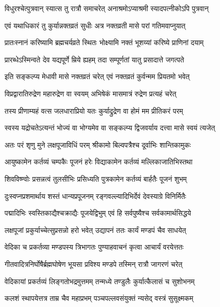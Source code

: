 \twolineshloka
{विधुरश्चेत्पुत्रवान् स्यात्स तु रात्रौ समाचरेत्}
{अनाश्रमोऽप्याश्रमी स्यादपत्नीकोऽपि पुत्रवान्} %

\twolineshloka
{एवं यथाधिकारं तु कुर्यान्नक्तव्रतं सुधीः}
{अत्र नक्तव्रती मासे परां गतिमवाप्नुयात्} %

\twolineshloka
{प्रातःस्नानं करिष्यामि ब्रह्मचर्यव्रते स्थितः}
{भोक्ष्यामि नक्तं भूशय्यां करिष्ये प्राणिनां दयाम्} %

\twolineshloka
{प्रारब्धेऽस्मिन्वते देव यद्यपूर्णे म्रिये ह्यहम्}
{तदा सम्पूर्णतां यातु प्रसादात्ते जगत्पते} %

\twolineshloka
{इति सङ्कल्प्य मेधावी मासे नक्तव्रतं चरेत्}
{एवं नक्तव्रतं कुर्वन्मम प्रियतमो भवेत्} %

\twolineshloka
{विप्रद्वारातिरुद्रेण महारुद्रेण वा स्वयम्}
{अभिषेकं मासमात्रं रुद्रेण प्रत्यहं चरेत्} %

\twolineshloka
{तस्य प्रीणाम्यहं वत्स जलधाराप्रियो यतः}
{कुर्याद्रुद्रेण वा होमं मम प्रीतिकरं परम्} %

\twolineshloka
{स्वस्य यद्रोचतेऽत्यन्तं भोज्यं वा भोग्यमेव वा}
{सङ्कल्प्य द्विजवर्याय दत्त्वा मासे स्वयं त्यजेत्} %

\twolineshloka
{अतः परं शृणु मुने लक्षपूजाविधिं परम्}
{श्रीकामो बिल्वपत्रैश्च दूर्वाभिः शान्तिकामुकः} %

\twolineshloka
{आयुष्कामेन कर्तव्यं चम्पकैः पूजनं हरेः}
{विद्याकामेन कर्तव्यं मल्लिकाजातिभिस्तथा} %

\twolineshloka
{शिवविष्ण्वोः प्रसन्नत्वं तुलसीभिः प्रसिध्यति}
{पुत्रकामेन कर्तव्यं बार्हतैः पूजनं शुभम्} %

\twolineshloka
{दुःस्वप्नप्रशमार्थाय शस्तं धान्यप्रपूजनम्}
{रङ्गवल्ल्यादिभिर्देवं देवस्याग्रे विनिर्मितैः} %

\twolineshloka
{पद्मादिभिः स्वस्तिकाद्यैश्चक्राद्यैः पूजयेद्विभुम्}
{एवं हि सर्वपुष्यैश्च सर्वकामार्थसिद्धये} %

\twolineshloka
{लक्षपूजां प्रकुर्याच्चेत्सुप्रसन्नो हरो भवेत्}
{उद्यापनं ततः कार्यं मण्डपं चैव साधयेत्} %

\twolineshloka
{वेदिका च प्रकर्तव्या मण्डपस्य त्रिभागतः}
{पुण्याहवाचनं कृत्वा आचार्यं वरयेत्ततः} %

\twolineshloka
{गीतवादित्रनिर्घोषैर्ब्रह्मघोषेण भूयसा}
{प्रविश्य मण्डपे तस्मिन् रात्रौ जागरणं चरेत्} %

\twolineshloka
{वेदिकायां प्रकर्तव्यं लिङ्गतोभद्रमुत्तमम्}
{तन्मध्ये तण्डुलैः कुर्यात्कैलासं च सुशोभनम्} %

\twolineshloka
{कलशं स्थापयेत्तत्र ताम्र चैव महाप्रभम्}
{पञ्चपल्लवसंयुक्तं न्यसेद् वस्त्रं सुसूक्ष्मकम्} %

